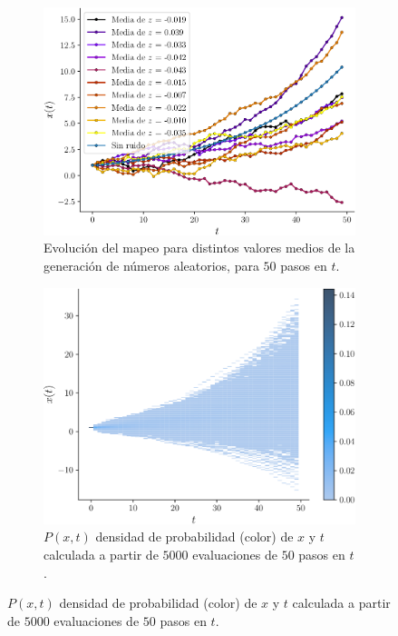 \documentclass[twocolumn,aps,prl]{revtex4-1}
\newcommand{\nSimulacionesB}{5000}
\newcommand{\Nsteps}{50}
\begin{document}
\begin{figure}[ht!]
  \centering
  \begin{subfigure}[b]{0.49\linewidth}
      \centering
      \includegraphics[width = 0.999\textwidth]{figuras/ex02-mapeo.pdf}
      \caption{Evolución del mapeo para distintos valores medios de la generación de números aleatorios, para $\Nsteps$ pasos en $t$.}
      \label{fig:figuras/ex02-mapeo}
  \end{subfigure}
  \begin{subfigure}[b]{0.49\linewidth}
      \centering
      \includegraphics[width = 0.999\textwidth]{figuras/ex02-histograma.pdf}
      \caption{$P(x,t)$ densidad de probabilidad (color) de $x$ y $t$ calculada a partir de $\nSimulacionesB$ evaluaciones de $\Nsteps$ pasos en $t$.}
      \label{fig:figuras/ex02-histograma}
  \end{subfigure}
\end{figure}
\end{document}
